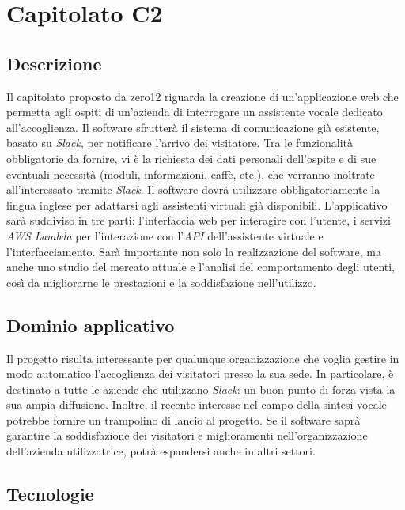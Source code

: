 \newpage
\section{Capitolato C2}

\subsection{Descrizione}

Il capitolato proposto da zero12 riguarda la creazione di un'applicazione
web che permetta agli ospiti di un'azienda di interrogare un assistente
vocale dedicato all'accoglienza. Il software sfrutterà il sistema
di comunicazione già esistente, basato su \textit{Slack}, per notificare l'arrivo dei visitatore. Tra le funzionalità obbligatorie da fornire,
vi è la richiesta dei dati personali dell'ospite e di sue eventuali
necessità (moduli, informazioni, caffè, etc.), che verranno inoltrate
all'interessato tramite \textit{Slack}. Il software dovrà utilizzare obbligatoriamente
la lingua inglese per adattarsi agli assistenti virtuali già disponibili.
L'applicativo sarà suddiviso in tre parti: l'interfaccia web per interagire
con l'utente, i servizi \textit{AWS Lambda} per l'interazione con l'\textit{API} dell'assistente
virtuale e l'interfacciamento. Sarà importante non solo la realizzazione
del software, ma anche uno studio del mercato attuale e l'analisi
del comportamento degli utenti, così da migliorarne le prestazioni
e la soddisfazione nell'utilizzo.

\subsection{Dominio applicativo}

Il progetto risulta interessante per qualunque organizzazione che voglia
gestire in modo automatico l'accoglienza dei visitatori presso la sua sede. In particolare,
è destinato a tutte le aziende che utilizzano \textit{Slack}: un buon punto di forza vista
la sua ampia diffusione. Inoltre, il recente interesse nel campo della
sintesi vocale potrebbe fornire un trampolino di lancio al progetto.
Se il software saprà garantire la soddisfazione dei visitatori e miglioramenti
nell'organizzazione dell'azienda utilizzatrice, potrà espandersi
anche in altri settori.

\subsection{Tecnologie}

